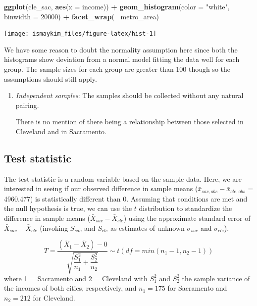\documentclass[12pt, krantz2,]{krantz}
\makeatletter
\newenvironment{Shaded}{\begin{snugshade}}{\end{snugshade}}
\newcommand{\DataTypeTok}[1]{\textcolor[rgb]{0.27,0.27,0.27}{#1}}
\newcommand{\DecValTok}[1]{\textcolor[rgb]{0.06,0.06,0.06}{#1}}
\newcommand{\KeywordTok}[1]{\textcolor[rgb]{0.27,0.27,0.27}{\textbf{#1}}}
\newcommand{\NormalTok}[1]{#1}
\newcommand{\OperatorTok}[1]{\textcolor[rgb]{0.43,0.43,0.43}{\textbf{#1}}}
\newcommand{\StringTok}[1]{\textcolor[rgb]{0.5,0.5,0.5}{#1}}
\newenvironment{kframe}{%
\medskip{}
\setlength{\fboxsep}{.8em}
 \def\at@end@of@kframe{}%
 \ifinner\ifhmode%
  \def\at@end@of@kframe{\end{minipage}}%
  \begin{minipage}{\columnwidth}%
 \fi\fi%
 \def\FrameCommand##1{\hskip\@totalleftmargin \hskip-\fboxsep
 \colorbox{shadecolor}{##1}\hskip-\fboxsep
     \hskip-\linewidth \hskip-\@totalleftmargin \hskip\columnwidth}%
 \MakeFramed {\advance\hsize-\width
   \@totalleftmargin\z@ \linewidth\hsize
   \@setminipage}}%
 {\par\unskip\endMakeFramed%
 \at@end@of@kframe}
\renewenvironment{Shaded}{\begin{kframe}}{\end{kframe}}
\makeatother
\begin{document}
\begin{Shaded}
\begin{Highlighting}[]
\KeywordTok{ggplot}\NormalTok{(cle_sac, }\KeywordTok{aes}\NormalTok{(}\DataTypeTok{x =}\NormalTok{ income)) }\OperatorTok{+}
\StringTok{  }\KeywordTok{geom_histogram}\NormalTok{(}\DataTypeTok{color =} \StringTok{"white"}\NormalTok{, }\DataTypeTok{binwidth =} \DecValTok{20000}\NormalTok{) }\OperatorTok{+}
\StringTok{  }\KeywordTok{facet_wrap}\NormalTok{(}\OperatorTok{~}\StringTok{ }\NormalTok{metro_area)}
\end{Highlighting}
\end{Shaded}

\begin{center}\texttt{[image: ismaykim\_files/figure-latex/hist-1]} \end{center}

We have some reason to doubt the normality assumption here since both the histograms show deviation from a normal model fitting the data well for each group. The sample sizes for each group are greater than 100 though so the assumptions should still apply.

\begin{enumerate}
\def\labelenumi{\arabic{enumi}.}
\setcounter{enumi}{2}
\item
  \emph{Independent samples}: The samples should be collected without any natural pairing.

  There is no mention of there being a relationship between those selected in Cleveland and in Sacramento.
\end{enumerate}

\hypertarget{test-statistic-3}{%
\subsection{Test statistic}\label{test-statistic-3}}

The test statistic is a random variable based on the sample data. Here, we are interested in seeing if our observed difference in sample means (\(\bar{x}_{sac, obs} - \bar{x}_{cle, obs}\) = 4960.477) is statistically different than 0. Assuming that conditions are met and the null hypothesis is true, we can use the \(t\) distribution to standardize the difference in sample means (\(\bar{X}_{sac} - \bar{X}_{cle}\)) using the approximate standard error of \(\bar{X}_{sac} - \bar{X}_{cle}\) (invoking \(S_{sac}\) and \(S_{cle}\) as estimates of unknown \(\sigma_{sac}\) and \(\sigma_{cle}\)).

\[ T =\dfrac{ (\bar{X}_1 - \bar{X}_2) - 0}{ \sqrt{\dfrac{S_1^2}{n_1} + \dfrac{S_2^2}{n_2}}  } \sim t (df = min(n_1 - 1, n_2 - 1)) \] where 1 = Sacramento and 2 = Cleveland with \(S_1^2\) and \(S_2^2\) the sample variance of the incomes of both cities, respectively, and \(n_1 = 175\) for Sacramento and \(n_2 = 212\) for Cleveland.
\end{document}

